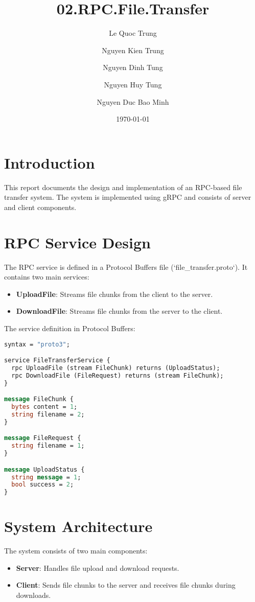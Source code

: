 \documentclass{article}
\title{02.RPC.File.Transfer}
\author{
    Le Quoc Trung \and 
    Nguyen Kien Trung \and 
    Nguyen Dinh Tung \and 
    Nguyen Huy Tung \and 
    Nguyen Duc Bao Minh
}
\date{\today}
\begin{document}
\maketitle

\section*{Introduction}
This report documents the design and implementation of an RPC-based file transfer system. The system is implemented using gRPC and consists of server and client components.

\section*{RPC Service Design}
The RPC service is defined in a Protocol Buffers file (`file_transfer.proto`). It contains two main services:
\begin{itemize}
    \item \textbf{UploadFile}: Streams file chunks from the client to the server.
    \item \textbf{DownloadFile}: Streams file chunks from the server to the client.
\end{itemize}

The service definition in Protocol Buffers:
\begin{lstlisting}[language=protobuf, caption={Protocol Buffers Definition}]
syntax = "proto3";

service FileTransferService {
  rpc UploadFile (stream FileChunk) returns (UploadStatus);
  rpc DownloadFile (FileRequest) returns (stream FileChunk);
}

message FileChunk {
  bytes content = 1;
  string filename = 2;
}

message FileRequest {
  string filename = 1;
}

message UploadStatus {
  string message = 1;
  bool success = 2;
}
\end{lstlisting}

\section*{System Architecture}
The system consists of two main components:
\begin{itemize}
    \item \textbf{Server}: Handles file upload and download requests.
    \item \textbf{Client}: Sends file chunks to the server and receives file chunks during downloads.
\end{itemize}
\end{document}
